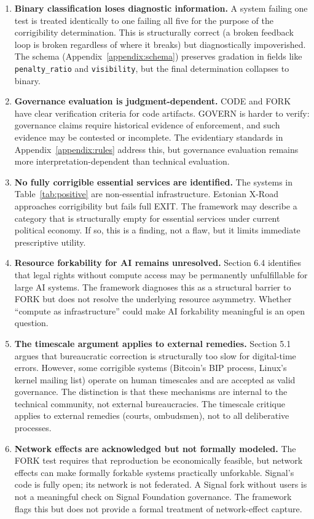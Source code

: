 \begin{enumerate}
    \item \textbf{Binary classification loses diagnostic information.} A system failing one test is treated identically to one failing all five for the purpose of the corrigibility determination. This is structurally correct (a broken feedback loop is broken regardless of where it breaks) but diagnostically impoverished. The schema (Appendix~\ref{appendix:schema}) preserves gradation in fields like \texttt{penalty\_ratio} and \texttt{visibility}, but the final determination collapses to binary.

    \item \textbf{Governance evaluation is judgment-dependent.} CODE and FORK have clear verification criteria for code artifacts. GOVERN is harder to verify: governance claims require historical evidence of enforcement, and such evidence may be contested or incomplete. The evidentiary standards in Appendix~\ref{appendix:rules} address this, but governance evaluation remains more interpretation-dependent than technical evaluation.

    \item \textbf{No fully corrigible essential services are identified.} The systems in Table~\ref{tab:positive} are non-essential infrastructure. Estonian X-Road approaches corrigibility but fails full EXIT. The framework may describe a category that is structurally empty for essential services under current political economy. If so, this is a finding, not a flaw, but it limits immediate prescriptive utility.

    \item \textbf{Resource forkability for AI remains unresolved.} Section 6.4 identifies that legal rights without compute access may be permanently unfulfillable for large AI systems. The framework diagnoses this as a structural barrier to FORK but does not resolve the underlying resource asymmetry. Whether ``compute as infrastructure'' could make AI forkability meaningful is an open question.

    \item \textbf{The timescale argument applies to external remedies.} Section 5.1 argues that bureaucratic correction is structurally too slow for digital-time errors. However, some corrigible systems (Bitcoin's BIP process, Linux's kernel mailing list) operate on human timescales and are accepted as valid governance. The distinction is that these mechanisms are internal to the technical community, not external bureaucracies. The timescale critique applies to external remedies (courts, ombudsmen), not to all deliberative processes.

    \item \textbf{Network effects are acknowledged but not formally modeled.} The FORK test requires that reproduction be economically feasible, but network effects can make formally forkable systems practically unforkable. Signal's code is fully open; its network is not federated. A Signal fork without users is not a meaningful check on Signal Foundation governance. The framework flags this but does not provide a formal treatment of network-effect capture.
\end{enumerate}

